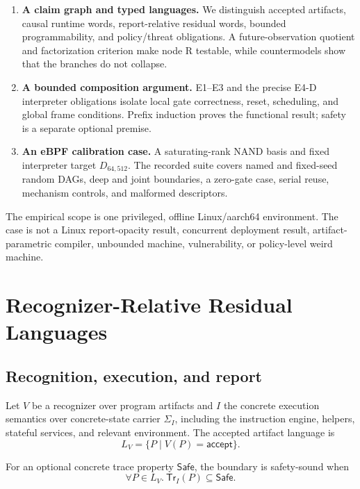 \documentclass[conference]{IEEEtran}
\begin{document}
\begin{enumerate}
\item \textbf{A claim graph and typed languages.} We distinguish accepted artifacts, causal runtime words, report-relative residual words, bounded programmability, and policy/threat obligations. A future-observation quotient and factorization criterion make node R testable, while countermodels show that the branches do not collapse.

\item \textbf{A bounded composition argument.} E1--E3 and the precise E4-D interpreter obligations isolate local gate correctness, reset, scheduling, and global frame conditions. Prefix induction proves the functional result; safety is a separate optional premise.

\item \textbf{An eBPF calibration case.} A saturating-rank NAND basis and fixed interpreter target $D_{64,512}$. The recorded suite covers named and fixed-seed random DAGs, deep and joint boundaries, a zero-gate case, serial reuse, mechanism controls, and malformed descriptors.
\end{enumerate}

The empirical scope is one privileged, offline Linux/aarch64 environment. The case is not a Linux report-opacity result, concurrent deployment result, artifact-parametric compiler, unbounded machine, vulnerability, or policy-level weird machine.

\section{Recognizer-Relative Residual Languages}

\subsection{Recognition, execution, and report}

Let $V$ be a recognizer over program artifacts and $I$ the concrete execution semantics over concrete-state carrier $\Sigma_I$, including the instruction engine, helpers, stateful services, and relevant environment. The accepted artifact language is
\begin{equation}
L_V = \{P \mid V(P)=\mathsf{accept}\}.
\end{equation}

For an optional concrete trace property $\mathsf{Safe}$, the boundary is safety-sound when
\begin{equation}
\forall P\in L_V.\ \mathsf{Tr}_I(P)\subseteq\mathsf{Safe}.
\end{equation}
\end{document}
